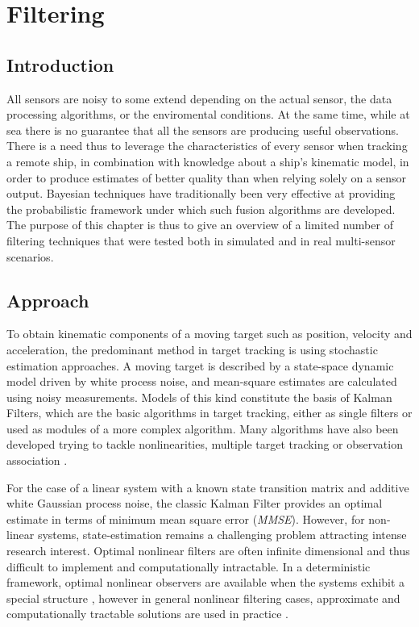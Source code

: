 \chapter{Filtering} \label{ch:filtering}
\section{Introduction}
All sensors are noisy to some extend depending on the actual sensor, the data processing algorithms, or the enviromental conditions. At the same time, while at sea there is no guarantee that all the sensors are producing useful observations. There is a need thus to leverage the characteristics of every sensor when tracking a remote ship, in combination with knowledge about a ship's kinematic model, in order to produce estimates of better quality than when relying solely on a sensor output. Bayesian techniques have traditionally been very effective at providing the probabilistic framework under which such fusion algorithms are developed. The purpose of this chapter is thus to give an overview of a limited number of filtering techniques that were tested both in simulated and in real multi-sensor scenarios.

\section{Approach}
To obtain kinematic components of a moving target such as position, velocity and acceleration, the predominant method in target tracking is using stochastic estimation approaches. A moving target is described by a state-space dynamic model driven by white process noise, and mean-square estimates are calculated using noisy measurements. Models of this kind constitute the basis of Kalman Filters, which are the basic algorithms in target tracking, either as single filters or used as modules of a more complex algorithm. Many algorithms have also been developed trying to tackle nonlinearities, multiple target tracking or observation association \cite{Ekstrand2012}.

For the case of a linear system with a known state transition matrix and additive white Gaussian process noise, the classic Kalman Filter provides an optimal estimate in terms of minimum mean square error (\emph{MMSE}). However, for non-linear systems, state-estimation remains a challenging problem attracting intense research interest. Optimal nonlinear filters are often infinite dimensional and thus difficult to implement and computationally intractable. In a deterministic framework, optimal nonlinear observers are available when the systems exhibit a special structure \cite{Krener1985} , however in general nonlinear filtering cases, approximate and computationally tractable solutions are used in practice \cite{Daum2005}.

